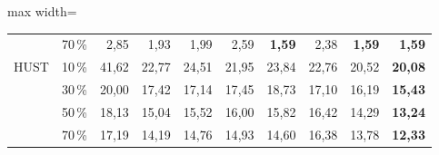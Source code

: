 \begin{table}[!htbp]
\begin{adjustbox}{max width=\textwidth}
\begin{tabular}{llrrrrrrrr}
 & 70\,\% & 2{,}85 & 1{,}93 & 1{,}99 & 2{,}59 & \textbf{1{,}59} & 2{,}38 & \textbf{1{,}59} & \textbf{1{,}59} \\
HUST & 10\,\% & 41{,}62 & 22{,}77 & 24{,}51 & 21{,}95 & 23{,}84 & 22{,}76 & 20{,}52 & \textbf{20{,}08} \\
 & 30\,\% & 20{,}00 & 17{,}42 & 17{,}14 & 17{,}45 & 18{,}73 & 17{,}10 & 16{,}19 & \textbf{15{,}43} \\
 & 50\,\% & 18{,}13 & 15{,}04 & 15{,}52 & 16{,}00 & 15{,}82 & 16{,}42 & 14{,}29 & \textbf{13{,}24} \\
 & 70\,\% & 17{,}19 & 14{,}19 & 14{,}76 & 14{,}93 & 14{,}60 & 16{,}38 & 13{,}78 & \textbf{12{,}33} \\
\bottomrule\end{tabular}\end{adjustbox}\end{table}

